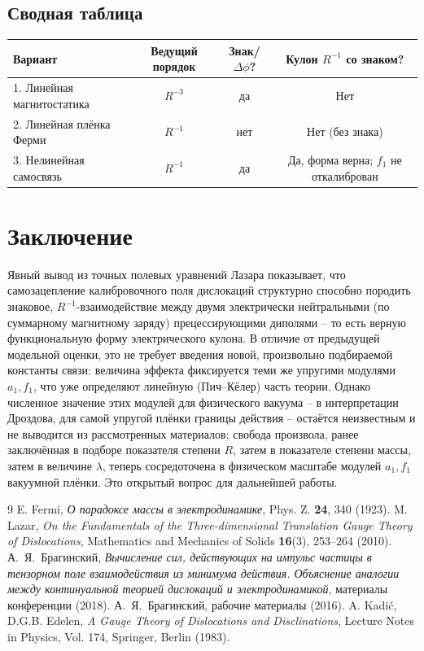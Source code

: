 \documentclass[12pt,a4paper]{article}
\begin{document}
\subsection{Сводная таблица}

\begin{center}
\begin{tabular}{|l|c|c|c|}
\hline
Вариант & Ведущий порядок & Знак/$\Delta\phi$? & Кулон $R^{-1}$ со знаком? \\
\hline
1. Линейная магнитостатика & $R^{-3}$ & да & Нет \\
2. Линейная плёнка Ферми & $R^{-1}$ & нет & Нет (без знака) \\
3. Нелинейная самосвязь & $R^{-1}$ & да & Да, форма верна; $f_1$ не откалиброван \\
\hline
\end{tabular}
\end{center}

\section{Заключение}

Явный вывод из точных полевых уравнений Лазара показывает, что
самозацепление калибровочного поля дислокаций структурно способно
породить знаковое, $R^{-1}$-взаимодействие между двумя электрически
нейтральными (по суммарному магнитному заряду) прецессирующими
диполями -- то есть верную функциональную форму электрического
кулона. В отличие от предыдущей модельной оценки, это не требует
введения новой, произвольно подбираемой константы связи: величина
эффекта фиксируется теми же упругими модулями $a_1,f_1$, что уже
определяют линейную (Пич--Кёлер) часть теории. Однако численное
значение этих модулей для физического вакуума -- в интерпретации
Дроздова, для самой упругой плёнки границы действия -- остаётся
неизвестным и не выводится из рассмотренных материалов; свобода
произвола, ранее заключённая в подборе показателя степени $R$, затем
в показателе степени массы, затем в величине $\lambda$, теперь
сосредоточена в физическом масштабе модулей $a_1,f_1$ вакуумной
плёнки. Это открытый вопрос для дальнейшей работы.

\begin{thebibliography}{9}
 E. Fermi, {\it О парадоксе массы в электродинамике},
Phys. Z. {\bf 24}, 340 (1923).
 M. Lazar, {\it On the Fundamentals of the
Three-dimensional Translation Gauge Theory of Dislocations},
Mathematics and Mechanics of Solids {\bf 16}(3), 253--264 (2010).
 А.~Я.~Брагинский, {\it Вычисление сил,
действующих на импульс частицы в тензорном поле взаимодействия из
минимума действия. Объяснение аналогии между континуальной теорией
дислокаций и электродинамикой}, материалы конференции (2018).
 А.~Я.~Брагинский, рабочие материалы (2016).
 A. Kadi\'c, D.G.B. Edelen, {\it A Gauge
Theory of Dislocations and Disclinations}, Lecture Notes in Physics,
Vol. 174, Springer, Berlin (1983).
\end{thebibliography}
\end{document}
